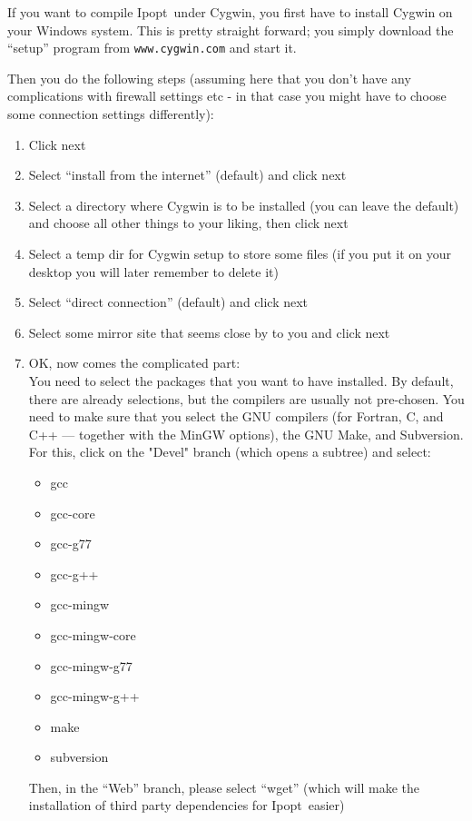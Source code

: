 \documentclass[10pt]{article}
\newcommand{\Ipopt}{{\sc Ipopt}}
\begin{document}
If you want to compile \Ipopt\ under Cygwin, you first have to install
Cygwin on your Windows system.  This is pretty straight forward; you
simply download the ``setup'' program from
\texttt{www.cygwin.com} and start it.

Then you do the following steps (assuming here that you don't have any
complications with firewall settings etc - in that case you might have
to choose some connection settings differently):

\begin{enumerate}
\item Click next
\item Select ``install from the internet'' (default) and click next
\item Select a directory where Cygwin is to be installed (you can
  leave the default) and choose all other things to your liking, then
  click next
\item Select a temp dir for Cygwin setup to store some files (if you
  put it on your desktop you will later remember to delete it)
\item Select ``direct connection'' (default) and click next
\item Select some mirror site that seems close by to you and click next
\item OK, now comes the complicated part:\\
  You need to select the packages that you want to have installed.  By
  default, there are already selections, but the compilers are usually
  not pre-chosen.  You need to make sure that you select the GNU
  compilers (for Fortran, C, and C++ --- together with the MinGW
  options), the GNU Make, and Subversion.  For this, click on the "Devel"
  branch (which opens a subtree) and select:
  \begin{itemize}
  \item gcc
  \item gcc-core
  \item gcc-g77
  \item gcc-g++
  \item gcc-mingw
  \item gcc-mingw-core
  \item gcc-mingw-g77
  \item gcc-mingw-g++
  \item make
  \item subversion
  \end{itemize}

  Then, in the ``Web'' branch, please select ``wget'' (which will make
  the installation of third party dependencies for \Ipopt\ easier)


\end{enumerate}
\end{document}
